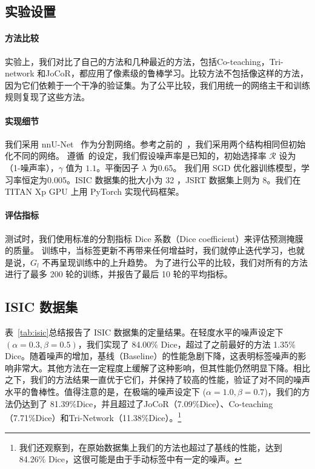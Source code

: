 \subsection{实验设置}
\paragraph{方法比较}
实验上，我们对比了自己的方法和几种最近的方法，包括Co-teaching\citep{Han2018CoteachingRT}，Tri-network\citep{Zhang2020RobustMI} 和JoCoR\citep{Wei2020CombatingNL}，都应用了像素级的鲁棒学习。比较方法不包括像\citet{ mirikharaji2019learning, Zhang2020CharacterizingLE}这样的方法，因为它们依赖于一个干净的验证集。为了公平比较，我们用统一的网络主干和训练规则复现了这些方法。

\paragraph{实现细节}
我们采用 nnU-Net~\cite{Isensee2020nnUNetAS} 作为分割网络。参考之前的~\citet{Malach2017DecouplingT}，我们采用两个结构相同但初始化不同的网络。
遵循~\citet{Han2018CoteachingRT}的设定，我们假设噪声率是已知的，初始选择率 $\mathcal{R}$ 设为（1-噪声率），$\gamma$ 值为 $1.1$。平衡因子 $\lambda$ 为0.65。
我们用 SGD 优化器训练模型，学习率恒定为0.005。ISIC 数据集的批大小为 32 ，JSRT 数据集上则为 8。我们在 TITAN Xp GPU 上用 PyTorch 实现代码框架。

\paragraph{评估指标}
测试时，我们使用标准的分割指标 Dice 系数（Dice coefficient）来评估预测掩膜的质量。
训练中，当标签更新不再带来任何增益时，我们就停止迭代学习，也就是说，$G_l$ 不再呈现训练中的上升趋势。
为了进行公平的比较，我们对所有的方法进行了最多 200 轮的训练，并报告了最后 10 轮的平均指标。

\subsection{ISIC 数据集}

表~\ref{tab:isic}总结报告了 ISIC 数据集的定量结果。在轻度水平的噪声设定下 $(\alpha=0.3, \beta=0.5)$，我们实现了 84.00\% Dice，超过了之前最好的方法 1.35\% Dice。随着噪声的增加，基线（Baseline）的性能急剧下降，这表明标签噪声的影响非常大。其他方法在一定程度上缓解了这种影响，但其性能仍然明显下降。相比之下，我们的方法结果一直优于它们，并保持了较高的性能，验证了对不同的噪声水平的鲁棒性。值得注意的是，在极端的噪声设定下 ($\alpha=1.0, \beta=0.7$)，我们的方法仍达到了 81.39\%Dice，并且超过了JoCoR（7.09\%Dice）、Co-teaching（7.71\%Dice）和Tri-Network（11.38\%Dice）。\footnote{我们还观察到，在原始数据集上我们的方法也超过了基线的性能，达到 84.26\% Dice，这很可能是由于手动标签中有一定的噪声。}

